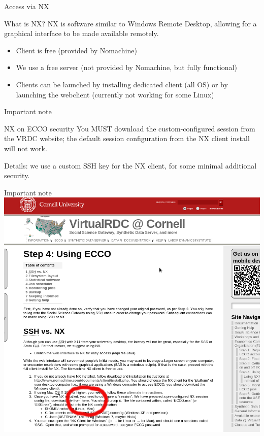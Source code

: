 \documentclass[xcolor=table,compress]{beamer}
\begin{document}
\begin{frame}{Access via NX}
\begin{block}{What is NX?}
NX is software similar to Windows Remote Desktop, allowing for a graphical interface to be made available remotely.
\end{block}
\begin{itemize}
\item Client is free (provided by Nomachine)
\item We use a free server (not provided by Nomachine, but fully functional)
\item Clients can be launched by installing dedicated client (all OS)  or by launching the webclient (currently not working for some Linux)
\end{itemize}
\end{frame}


\begin{frame}{Important note}
\begin{block}{NX on ECCO security}
You MUST download the custom-configured session from the VRDC website; the default session configuration from the NX client install will not work.
\end{block}
\tiny Details: we use a custom SSH key for the NX client, for some minimal additional security.
\end{frame}


\begin{frame}{Important note}
\includegraphics[height=.7\textheight]{nx-ecco-key.png}
\end{frame}
\end{document}
